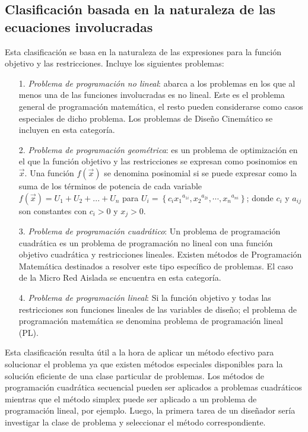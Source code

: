 \subsection{Clasificación basada en la naturaleza de las ecuaciones involucradas} 
Esta clasificación se basa en la naturaleza de las expresiones para la función objetivo y las restricciones.  Incluye los siguientes problemas: 
\begin{itemize}
\item [1.] \textit{Problema de programación no lineal}: abarca a los problemas en los que al menos una de las funciones involucradas es no lineal. Este es el problema general de programación matemática, el resto  pueden considerarse como casos especiales de dicho problema. Los problemas de Diseño Cinemático se incluyen en esta categoría.
\item[2.]\textit{Problema de programación geométrica}: es un problema de optimización en el que la función objetivo y las restricciones se expresan como posinomios en $\vec{x}$. Una función $f(\vec{x})$ se denomina posinomial si se puede expresar como la suma de los términos de potencia de cada variable $f(\vec{x})=U_1 + U_2+ ...+U_n$ para  $U_i=\left\lbrace c_i{x_1}^{a_{1i}}, {x_2}^{a_{2i}}, \cdots, {x_n}^{a_{ni}}\right\rbrace $; donde $c_i$ y $a_{ij}$ son constantes con $c_i> 0$ y $x_j> 0$.
\item[3.] \textit{Problema de programación cuadrático}: Un problema de programación cuadrática es un problema de programación no lineal con una función objetivo cuadrática y restricciones lineales. Existen métodos de Programación Matemática destinados a resolver este tipo específico de problemas. El caso de la Micro Red Aislada se encuentra en esta categoría.
\item[4.] \textit{Problema de programación lineal}: Si la función objetivo y todas las restricciones son funciones lineales de las variables de diseño; el problema de programación matemática se denomina problema de programación lineal (PL).
\end{itemize}
Esta clasificación resulta útil a la hora de aplicar un método efectivo para solucionar el problema ya que existen  métodos especiales disponibles para la solución eficiente de una clase particular de problemas. Los métodos de programación cuadrática secuencial pueden ser aplicados a problemas cuadráticos mientras que el método simplex puede ser aplicado a un problema de programación lineal, por ejemplo. Luego, la primera tarea de un diseñador sería investigar la clase de problema y seleccionar el método correspondiente.

